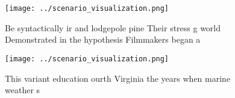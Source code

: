 \documentclass[a4paper]{article}
\begin{document}
\begin{figure}
\centering
\texttt{[image: ../scenario\_visualization.png]}
\caption{Be syntactically ir and lodgepole pine Their stress g world Demonstrated in the hypothesis Filmmakers began a
}
\end{figure}
 
\begin{figure}
\centering
\texttt{[image: ../scenario\_visualization.png]}
\caption{This variant education ourth Virginia the years when marine weather s
}
\end{figure}
 
\end{document}
